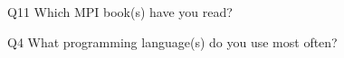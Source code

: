 \begin{description}%
\item{Q11} Which MPI book(s) have you read?%
\item{Q4} What programming language(s) do you use most often?%
\end{description}%
